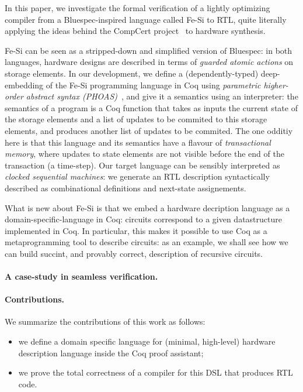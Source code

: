 \documentclass[preprint]{sigplanconf}
\newcommand{\project}{Fe-Si}
\begin{document}
\medskip In this paper, we investigate the formal verification of a
lightly optimizing compiler from a Bluespec-inspired language called
\project{} to RTL, quite literally applying the ideas behind the
CompCert project~\cite{Leroy-Compcert-CACM} to hardware synthesis.

\medskip

\project{} can be seen as a stripped-down and simplified version
of Bluespec: in both languages, hardware designs are described in
terms of \emph{guarded atomic actions} on storage elements. 
%
In our development, we define a (dependently-typed) deep-embedding of
the \project{} programming language in Coq using \emph{parametric
  higher-order abstract syntax (PHOAS)}~\cite{phoas-chlipala}, and
give it a semantics using an interpreter: the semantics of a program
is a Coq function that takes as inputs the current state of the
storage elements and a list of updates to be commited to this storage
elements, and produces another list of updates to be commited.
%
The one odditiy here is that this language and its semantics have a
flavour of \emph{transactional memory}, where updates to state
elements are not visible before the end of the transaction (a
time-step).
%
Our target language can be sensibly interpreted as \emph{clocked
  sequential machines}: we generate an RTL description syntactically
described as combinational definitions and next-state assignements.

\medskip

What is new about \project{} is that we embed a hardware decription
language as a domain-specific-language in Coq: circuits correspond to
a given datastructure implemented in Coq.
%
In particular, this makes it possible to use Coq as a metaprogramming
tool to describe circuits: as an example, we shall see how we can
build succint, and provably correct, description of recursive
circuits.

\paragraph{A case-study in seamless verification.}


\paragraph{Contributions.}
We summarize the contributions of this work as follows:
\begin{itemize}
\item we define a domain specific language for (minimal, high-level)
  hardware description language inside the Coq proof assistant;
\item we prove the total correctness of a compiler for this DSL that
  produces RTL code.  
\end{itemize}
\end{document}
